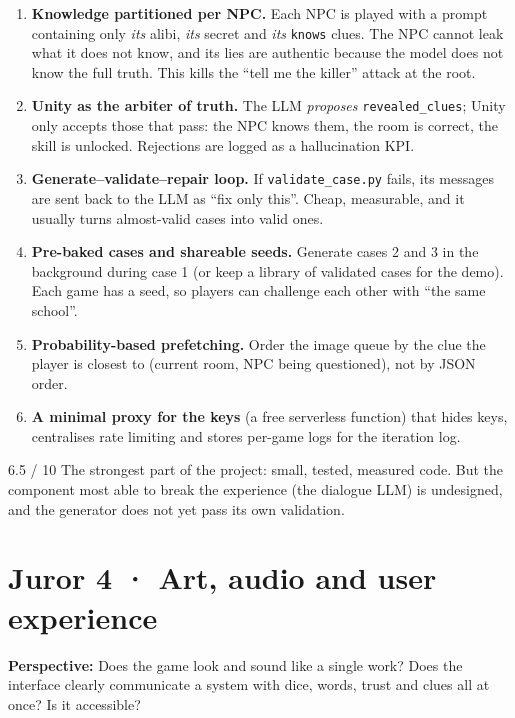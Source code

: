 \documentclass[11pt,a4paper]{article}
\newcommand{\file}[1]{\texttt{\small #1}}
\begin{document}
\begin{inedito}
\begin{enumerate}
\item \textbf{Knowledge partitioned per NPC.} Each NPC is played with a prompt containing only
\emph{its} alibi, \emph{its} secret and \emph{its} \texttt{knows} clues. The NPC cannot leak what it
does not know, and its lies are authentic because the model does not know the full truth. This kills
the ``tell me the killer'' attack at the root.
\item \textbf{Unity as the arbiter of truth.} The LLM \emph{proposes} \texttt{revealed\_clues};
Unity only accepts those that pass: the NPC knows them, the room is correct, the skill is unlocked.
Rejections are logged as a hallucination KPI.
\item \textbf{Generate--validate--repair loop.} If \file{validate\_case.py} fails, its messages are
sent back to the LLM as ``fix only this''. Cheap, measurable, and it usually turns almost-valid cases
into valid ones.
\item \textbf{Pre-baked cases and shareable seeds.} Generate cases 2 and 3 in the background during
case 1 (or keep a library of validated cases for the demo). Each game has a seed, so players can
challenge each other with ``the same school''.
\item \textbf{Probability-based prefetching.} Order the image queue by the clue the player is closest
to (current room, NPC being questioned), not by JSON order.
\item \textbf{A minimal proxy for the keys} (a free serverless function) that hides keys, centralises
rate limiting and stores per-game logs for the iteration log.
\end{enumerate}
\end{inedito}

\begin{veredicto}{6.5 / 10}
The strongest part of the project: small, tested, measured code. But the component most able to break
the experience (the dialogue LLM) is undesigned, and the generator does not yet pass its own
validation.
\end{veredicto}

\section{Juror 4 · Art, audio and user experience}

\begin{perfil}
\textbf{Perspective:} Does the game look and sound like a single work? Does the interface clearly
communicate a system with dice, words, trust and clues all at once? Is it accessible?
\end{perfil}
\end{document}
